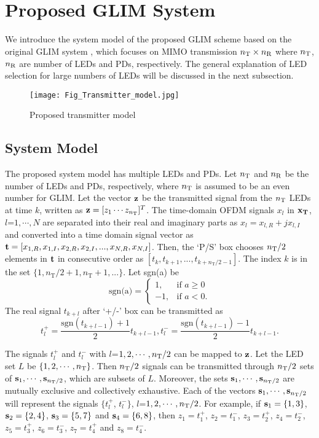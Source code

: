 \documentclass[12pt,letterpaper]{IEEEtran}
\begin{document}
~~

~~
\section{Proposed GLIM System}
We introduce the system model of the proposed GLIM scheme based on the original GLIM system \cite{yesilkaya_optical_2017}, which focuses on MIMO transmission $n_{\text T} \times n_{\text R}$ where $n_{\text T}$, $n_{\text R}$ are number of LEDs and PDs, respectively. The general explanation of LED selection for large numbers of LEDs will be discussed in the next subsection. 
\begin{figure}[h] 
	\centering
	\texttt{[image: Fig\_Transmitter\_model.jpg]}
	\caption{Proposed transmitter model}
	\label{Fig:LED_4x4}
\end{figure}
\subsection{System Model}
The proposed system model has multiple LEDs and PDs. Let $n_{\text T}$ and $n_{\text R}$ be the number of LEDs and PDs, respectively, where $n_{\text T}$ is assumed to be an even number for GLIM.
Let the vector $\bold z$ be the transmitted signal from the $n_{\text T}$ LEDs at time $k$, written as $\bold z = [z_{1} \cdots {z_{n_{\text T}}}]^T$.
The time-domain OFDM signals $x_l$ in ${{\bf{x}}_{\bf{T}}}$, $l$=$1,\cdots,N$ are separated into their real and imaginary parts as $x_l =x_{l, {R}}+jx_{l,{I}}$ and converted into a time domain signal vector as ${\bf{t}} = \left[ {{x_{1,R}},{x_{1,I}},{x_{2,R}},{x_{2,I}},...,{x_{N,R}},{x_{N,I}}} \right]$. Then, the `P/S' box chooses $n_{\text T}/2$ elements in ${\bf{t}}$ in consecutive order as $\left[ {{t_k},{t_{k + 1}},...,{t_{k + {n_{\text{T}}}/2 - 1}}} \right]$. The index $k$ is in the set $\{1,{n_{\text{T}}}/2 + 1,{n_{\text{T}}} + 1,...\}$. Let sgn(a) be
\[
\textrm{sgn(a)}=\left\{ \begin{matrix} 1, & \text{if~} a \geq 0 \\ -1, &\text{if~} a<0. \end{matrix}  \right.
\]
The real signal $t_{k+l}$ after `+/-' box can be transmitted as
\[
t_{l}^+=\frac{\textrm{sgn}(t_{k+l-1})+1}{2} t_{k+l-1},
t_{l}^-=\frac{\textrm{sgn}(t_{k+l-1})-1}{2} t_{k+l-1}. \]

The signals $t_{l}^+$ and $t_{l}^-$ with $l$=$1, 2,\cdots,n_{\text T}/2$ can be mapped to $\bold z$. Let the LED set $L$ be $\{1, 2, \cdots, n_{\text T} \}$. Then $n_{\text T}/2$ signals can be transmitted through ${n_{\text T}/2}$ sets of ${\bold s}_1, \cdots, {\bold s}_{{n_{\text T}}/2}$, which are subsets of $L$. Moreover, the sets ${\bold s}_1, \cdots, {\bold s}_{{n_{\text T}}/2}$ are mutually exclusive and collectively exhaustive. Each of the vectors ${\bold s}_1, \cdots, {\bold s}_{n_{\text T}/2} $ will represent the signals $\{t_{l}^+$, $t_{l}^-\}$, $l$=$1,2,\cdots,n_{\text T}/2$.
For example, if ${\bold s}_1 =\{1, 3\}$, ${\bold s}_2 =\{2, 4\}$, ${\bold s}_3=\{5, 7\}$ and ${\bold s}_4 =\{6, 8\}$, then ${z_{1}} = t_{1}^ + $, ${z_{2}} = t_{1}^ - $, ${z_{3}} = t_{2}^ + $, ${z_{4}} = t_{2}^ - $, ${z_{5}} = t_{3}^ + $, ${z_{6}} = t_{3}^ - $, ${z_{7}} = t_{4}^ + $ and ${z_{8}} = t_{4}^ - $.
\end{document}
